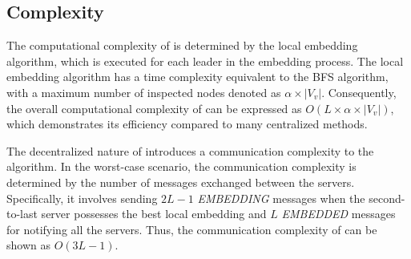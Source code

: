 \subsection{Complexity}

The computational complexity of {\ourAlg} is determined by the local embedding algorithm, which is executed for each leader in the embedding process. The local embedding algorithm has a time complexity equivalent to the BFS algorithm, with a maximum number of inspected nodes denoted as $\alpha\times|V_v|$. Consequently, the overall computational complexity of {\ourAlg} can be expressed as $O(L\times\alpha\times|V_v|)$, which demonstrates its efficiency compared to many centralized methods.

The decentralized nature of {\ourAlg} introduces a communication complexity to the algorithm. In the worst-case scenario, the communication complexity is determined by the number of messages exchanged between the servers. Specifically, it involves sending $2L - 1$ \textit{EMBEDDING} messages when the second-to-last server possesses the best local embedding and $L$ \textit{EMBEDDED} messages for notifying all the servers. Thus, the communication complexity of {\ourAlg} can be shown as $O(3L - 1)$.